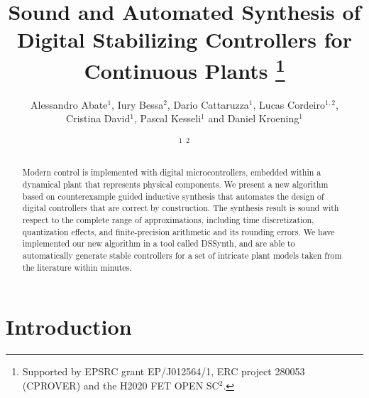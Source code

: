 \documentclass[final]{sig-alternate-05-2015}
\begin{document}

\title{
Sound and Automated Synthesis of Digital Stabilizing Controllers for Continuous
Plants%
\thanks{Supported by EPSRC grant EP/J012564/1,
ERC project 280053 (CPROVER) and the H2020 FET OPEN SC$^2$.}}

\author{Alessandro Abate$^{1}$, Iury Bessa$^{2}$, Dario Cattaruzza$^{1}$, Lucas Cordeiro$^{1,2}$, \\ 
Cristina David$^{1}$, Pascal Kesseli$^{1}$ and Daniel Kroening$^{1}$
\and
$^{1}$ \quad
$^{2}$
}

\newcommand\tool{{\sf DSSynth}\xspace}

\maketitle

\begin{abstract}
%
Modern control is implemented with digital microcontrollers, embedded within
a dynamical plant that represents physical components.
%
We present a new algorithm based on counter\-example guided inductive
synthesis that automates the design of digital controllers that are
correct by construction.  The synthesis result is sound with respect to the
complete range of approximations, including time discretization,
quantization effects, and finite-precision arithmetic and its
rounding errors.
%
We have implemented our new algorithm in a tool called \tool, and are able
to automatically generate stable controllers for a set of intricate plant
models taken from the literature within minutes.
%
\end{abstract}

%
%
\printccsdesc


\section{Introduction}
\end{document}
